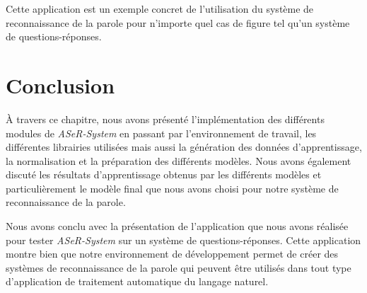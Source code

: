 Cette application est un exemple concret de l'utilisation du système de reconnaissance de la parole pour n'importe quel cas de figure tel qu'un système de questions-réponses.

\section{Conclusion}
À travers ce chapitre, nous avons présenté l'implémentation des différents modules de \textit{ASeR-System} en passant par l'environnement de travail, les différentes librairies utilisées mais aussi la génération des données d'apprentissage, la normalisation et la préparation des différents modèles. Nous avons également discuté les résultats d'apprentissage obtenus par les différents modèles et particulièrement le modèle final que nous avons choisi pour notre système de reconnaissance de la parole.

Nous avons conclu avec la présentation de l'application que nous avons réalisée pour tester \textit{ASeR-System} sur un système de questions-réponses. Cette application montre bien que notre environnement de développement permet de créer des systèmes de reconnaissance de la parole qui peuvent être utilisés dans tout type d'application de traitement automatique du langage naturel. 